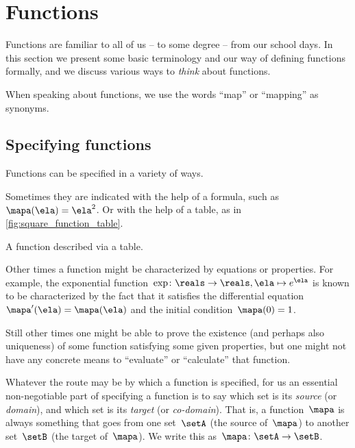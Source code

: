 
\section{Functions}
\label{sec:functions}

Functions are familiar to all of us -- to some degree -- from our school days.
In this section we present some basic terminology and our way of defining functions formally, and we discuss various ways to \emph{think} about functions.

When speaking about functions, we use the words ``map'' or ``mapping'' as synonyms.

\subsection{Specifying functions}
\label{sec:domain-codomain}

Functions can be specified in a variety of ways.

Sometimes they are indicated with the help of a formula, such as~$\mapa(\ela)=\ela^2$.
Or with the help of a table, as in \cref{fig:square_function_table}.

\begin{marginfigure}
    \centering
    \caption{A function described via a table.}
    \label{fig:square_function_table}
\end{marginfigure}

Other times a function might be characterized by equations or properties.
For example, the exponential function~$\exp \colon \reals \to \reals, \ela \mapsto e^\ela$ is known to be characterized by the fact that it satisfies the differential equation~$\mapa'(\ela) = \mapa(\ela)$ and the initial condition~$\mapa(0) =1$.

Still other times one might be able to prove the existence (and perhaps also uniqueness) of some function satisfying some given properties, but one might not have any concrete means to ``evaluate'' or ``calculate'' that function.

Whatever the route may be by which a function is specified, for us an essential non-negotiable part of specifying a function is to say which set is its \emph{source} (or \emph{domain}), and which set is its \emph{target} (or \emph{co-domain}).
That is, a function~$\mapa$ is always something that goes from one set~$\setA$ (the source of~$\mapa$) to another set~$\setB$ (the target of~$\mapa$).
We write this as~$\mapa\colon \setA \to \setB$.

